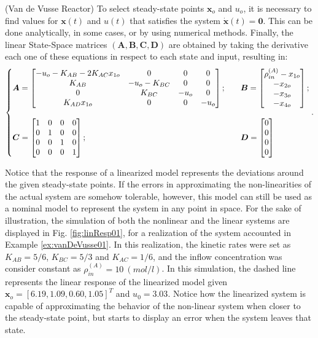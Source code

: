 \documentclass[a4paper,11pt]{book}
\numberwithin{figure}{chapter}
\numberwithin{equation}{chapter}
\numberwithin{table}{chapter}
\theoremstyle{definition}
\newtheorem{example}{Example}[chapter]
\newcounter{boxed-theorem}
\newcounter{boxed-definition}
\newcounter{boxed-example}
\newenvironment{boxed-example}[1]
{\colorlet{shadecolor}{pastelRed!20} \begin{shaded} \begin{example}{#1}}
{\end{example} \end{shaded}}
\begin{document}
\begin{boxed-example}{(Van de Vusse Reactor)}
	To select steady-state points $\bm{x}_o$ and $u_o$, it is necessary to find values for $\bm{x}(t)$ and $u(t)$ that satisfies the system $\dot{\bm{x}}(t) = \bm{0}$. This can be done analytically, in some cases, or by using numerical methods. Finally, the linear State-Space matrices $(\bm{A}, \bm{B}, \bm{C}, \bm{D})$ are obtained by taking the derivative each one of these equations in respect to each state and input, resulting in:
	\begin{align}   \label{eq:isoReact01}
	\left\{ \begin{matrix*}[l]
	    \bm{A} = \begin{bmatrix}
	        -u_o - K_{AB} - 2K_{AC} x_{1o} & 0 & 0 & 0 \\ K_{AB} & -u_o - K_{BC} & 0 & 0 \\ 0 & K_{BC} & -u_o & 0 \\ K_{AD} x_{1o} & 0 & 0 & -u_o
	    \end{bmatrix}; \hfill & &
	    \bm{B} = \begin{bmatrix}
	        \rho_{in}^{(A)}-x_{1o} \\ -x_{2o} \\ -x_{3o} \\ -x_{4o} 
	    \end{bmatrix}; \hfill \\  \\ 
	    \bm{C} = \begin{bmatrix}
	        1 & 0 & 0 & 0 \\ 0 & 1 & 0 & 0 \\ 0 & 0 & 1 & 0 \\ 0 & 0 & 0 & 1
	    \end{bmatrix}; \hfill & &
	    \bm{D} = \begin{bmatrix}
	        0 \\ 0 \\ 0 \\ 0
	    \end{bmatrix} \hfill
	\end{matrix*} \right.
	.\end{align}
\end{boxed-example}

	Notice that the response of a linearized model represents the deviations around the given steady-state points. If the errors in approximating the non-linearities of the actual system are somehow tolerable, however, this model can still be used as a nominal model to represent the system in any point in space. For the sake of illustration, the simulation of both the nonlinear and the linear systems are displayed in Fig. \ref{fig:linResp01}, for a realization of the system accounted in Example \ref{ex:vanDeVusse01}. In this realization, the kinetic rates were set as $K_{AB} = 5/6$, $K_{BC} = 5/3$ and $K_{AC} = 1/6$, and the inflow concentration was consider constant as $\rho_{in}^{(A)} = 10\ (mol/l)$. In this simulation, the dashed line represents the linear response of the linearized model given $\bm{x}_o = [6.19, 1.09, 0.60, 1.05]^T$ and $u_0 = 3.03$. Notice how the linearized system is capable of approximating the behavior of the non-linear system when closer to the steady-state point, but starts to display an error when the system leaves that state.
	
\end{document}
